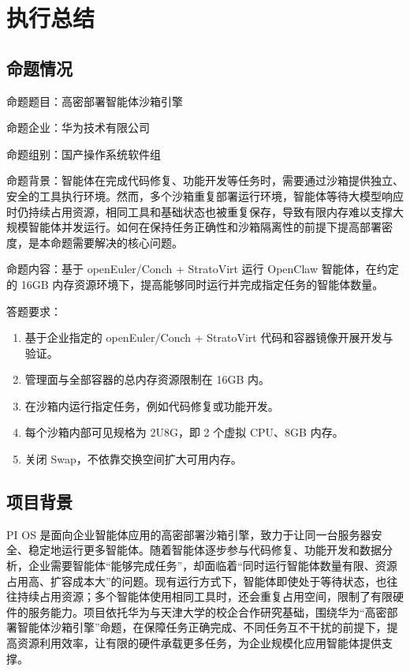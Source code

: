 \chapter{执行总结}
\section{命题情况}\label{sec:1.1}
命题题目：高密部署智能体沙箱引擎

命题企业：华为技术有限公司

命题组别：国产操作系统软件组

命题背景：智能体在完成代码修复、功能开发等任务时，需要通过沙箱提供独立、安全的工具执行环境。然而，多个沙箱重复部署运行环境，智能体等待大模型响应时仍持续占用资源，相同工具和基础状态也被重复保存，导致有限内存难以支撑大规模智能体并发运行。如何在保持任务正确性和沙箱隔离性的前提下提高部署密度，是本命题需要解决的核心问题。

命题内容：基于 openEuler/\allowbreak{}Conch + StratoVirt 运行 OpenClaw 智能体，在约定的 16GB 内存资源环境下，提高能够同时运行并完成指定任务的智能体数量。

答题要求：

\begin{enumerate}
\item 基于企业指定的 openEuler/\allowbreak{}Conch + StratoVirt 代码和容器镜像开展开发与验证。
\item 管理面与全部容器的总内存资源限制在 16GB 内。
\item 在沙箱内运行指定任务，例如代码修复或功能开发。
\item 每个沙箱内部可见规格为 2U8G，即 2 个虚拟 CPU、8GB 内存。
\item 关闭 Swap，不依靠交换空间扩大可用内存。
\end{enumerate}
\section{项目背景}\label{sec:1.2}
PI OS 是面向企业智能体应用的高密部署沙箱引擎，致力于让同一台服务器安全、稳定地运行更多智能体。随着智能体逐步参与代码修复、功能开发和数据分析，企业需要智能体“能够完成任务”，却面临着“同时运行智能体数量有限、资源占用高、扩容成本大”的问题。现有运行方式下，智能体即使处于等待状态，也往往持续占用资源；多个智能体使用相同工具时，还会重复占用空间，限制了有限硬件的服务能力。项目依托华为与天津大学的校企合作研究基础，围绕华为“高密部署智能体沙箱引擎”命题，在保障任务正确完成、不同任务互不干扰的前提下，提高资源利用效率，让有限的硬件承载更多任务，为企业规模化应用智能体提供支撑。

